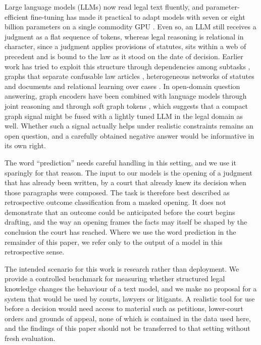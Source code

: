 \documentclass[11pt,a4paper]{article}
\begin{document}
Large language models (LLMs) now read legal text fluently, and parameter-efficient fine-tuning has made it practical to adapt models with seven or eight billion parameters on a single commodity GPU \cite{r13,r14}. Even so, an LLM still receives a judgment as a flat sequence of tokens, whereas legal reasoning is relational in character, since a judgment applies provisions of statutes, sits within a web of precedent and is bound to the law as it stood on the date of decision. Earlier work has tried to exploit this structure through dependencies among subtasks \cite{r5}, graphs that separate confusable law articles \cite{r15}, heterogeneous networks of statutes and documents \cite{r16,r17} and relational learning over cases \cite{r18}. In open-domain question answering, graph encoders have been combined with language models through joint reasoning \cite{r19,r20} and through soft graph tokens \cite{r21,r22,r23}, which suggests that a compact graph signal might be fused with a lightly tuned LLM in the legal domain as well. Whether such a signal actually helps under realistic constraints remains an open question, and a carefully obtained negative answer would be informative in its own right.

The word ``prediction'' needs careful handling in this setting, and we use it sparingly for that reason. The input to our models is the opening of a judgment that has already been written, by a court that already knew its decision when those paragraphs were composed. The task is therefore best described as retrospective outcome classification from a masked opening. It does not demonstrate that an outcome could be anticipated before the court begins drafting, and the way an opening frames the facts may itself be shaped by the conclusion the court has reached. Where we use the word prediction in the remainder of this paper, we refer only to the output of a model in this retrospective sense.

The intended scenario for this work is research rather than deployment. We provide a controlled benchmark for measuring whether structured legal knowledge changes the behaviour of a text model, and we make no proposal for a system that would be used by courts, lawyers or litigants. A realistic tool for use before a decision would need access to material such as petitions, lower-court orders and grounds of appeal, none of which is contained in the data used here, and the findings of this paper should not be transferred to that setting without fresh evaluation.
\end{document}
